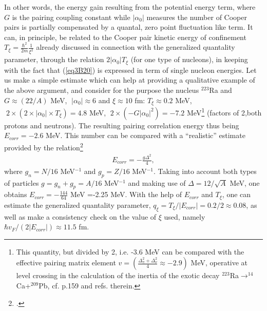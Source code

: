 \begin{subappendices}
 
 In other words, the energy gain resulting from the potential energy term, where $G$ is the pairing coupling constant while $|\alpha_0|$ measures the number of Cooper pairs is partially compensated by a quantal, zero point fluctuation like term. It can, in principle, be related to the Cooper pair kinetic energy of confinement $T_\xi=\frac{\hbar^2}{2m}\frac{1}{\xi^2}$ already discussed in connection with the generalized quantality parameter, through the relation $2|\alpha_0|T_\xi$ (for one type of nucleons), in keeping with the fact that (\ref{eq3B20}) is expressed in term of single nucleon energies. Let us make a simple estimate which can help at providing a qualitative example of the above argument, and consider for the purpose the nucleus $^{223}$Ra and $G\approx(22/A)$ MeV,      $\;|\alpha_0|\approx 6$ and $\xi\approx 10$ fm: $T_\xi\approx 0.2 $ MeV, $\;2\times(2\times|\alpha_0|\times T_\xi)=4.8$ MeV, $\;2\times (-G|\alpha_0|^2)=-7.2$ MeV\footnote{This quantity, but divided by 2, i.e. -3.6 MeV can be compared with the effective pairing matrix element $v=\left(\frac{\Delta_\pi^2+\Delta_\nu^2}{4}\approx -2.9 \right)$ MeV, operative at level crossing in the calculation of the inertia of the exotic decay $^{223}$Ra$\rightarrow^{14}$Ca+$^{209}$Pb, cf. \cite{Brink:05} p.159 and refs. therein.} (factors of 2,both protons and neutrons). The resulting pairing correlation energy thus being $E_{corr}=-2.6$ MeV. This number can be compared with a ``realistic'' estimate provided by the relation\footnote{\cite{Brink:05}.}
   \begin{align}\label{eq3B21}
E_{corr}=-\frac{g\Delta^2}{4},
   \end{align}  
 where $g_n=N/16$ MeV$^{-1}$ and $g_p=Z/16$ MeV$^{-1}$. Taking into account both types of particles $g=g_n+g_p=A/16$ MeV$^{-1}$ and making use of $\Delta=12/\sqrt{A}$ MeV, one obtains $E_{corr}=-\frac{144}{64}$ MeV =-2.25 MeV. With the help of $E_{corr}$ and $T_\xi$, one can estimate the generalized quantality parameter, $q_\xi=T_\xi/|E_{corr}|=0.2/2\approx 0.08$, as well as make a consistency check  on the value of $\xi$ used, namely $\hbar v_F/(2|E_{corr}|)\approx 11.5$ fm.
 

\end{subappendices}

